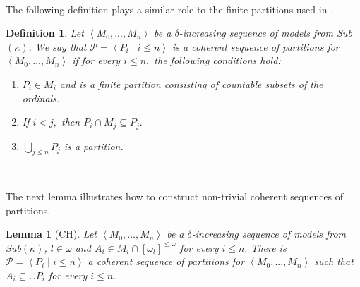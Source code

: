 \documentclass{article}%
\newtheorem{definition}[theorem]{Definition}
\newtheorem{lemma}[theorem]{Lemma}
\begin{document}
\qquad\ \ \qquad\ \ 

The following definition plays a similar role to the finite partitions used in
\cite{PFiltersCohenRandomLaver}.

\begin{definition}
Let $\left\langle M_{0},...,M_{n}\right\rangle $ be a $\delta$-increasing
sequence of models from \textsf{Sub}$\left(  \kappa\right)  $. We say that
$\mathcal{P}=\left\langle P_{i}\mid i\leq n\right\rangle $ i\emph{s a coherent
sequence of partitions for} $\left\langle M_{0},...,M_{n}\right\rangle $ if
for every $i\leq n,$ the following conditions hold:

\begin{enumerate}
\item $P_{i}\in M_{i}$ and is a finite partition consisting of countable
subsets of the ordinals.

\item If $i<j,$ then $P_{i}\cap M_{j}\subseteq P_{j}.$

\item $%
{\textstyle\bigcup\limits_{j\leq n}}
P_{j}$ is a partition.
\end{enumerate}
\end{definition}

\qquad\qquad\ \ 

The next lemma illustrates how to construct non-trivial coherent sequences of partitions.

\begin{lemma}
[\textsf{CH}]Let $\left\langle M_{0},...,M_{n}\right\rangle $ be a $\delta
$-increasing sequence of models from \textsf{Sub}$\left(  \kappa\right)  $,
$l\in\omega$ and $A_{i}\in M_{i}\cap\left[  \omega_{l}\right]  ^{\leq\omega}$
for every $i\leq n.$ There is $\mathcal{P}=\left\langle P_{i}\mid i\leq
n\right\rangle $ a coherent sequence of partitions for $\left\langle
M_{0},...,M_{n}\right\rangle $ such that $A_{i}\subseteq\cup P_{i}$ for every
$i\leq n.$ \label{Lema particion que cubre}
\end{lemma}
\end{document}

